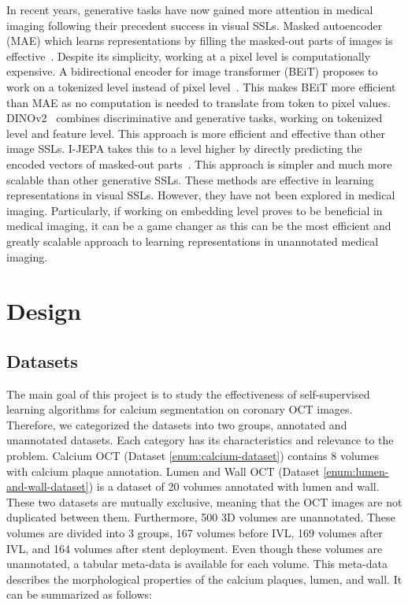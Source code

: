 \documentclass[a4paper,11pt,oneside]{report}
\begin{document}
In recent years, generative tasks have now gained more attention in medical imaging following their precedent success in visual SSLs. Masked autoencoder (MAE) which learns representations by filling the masked-out parts of images is effective~\cite{He2022}. Despite its simplicity, working at a pixel level is computationally expensive. A bidirectional encoder for image transformer (BEiT) proposes to work on a tokenized level instead of pixel level~\cite{Bao2022beit}. This makes BEiT more efficient than MAE as no computation is needed to translate from token to pixel values. DINOv2~\cite{Oquab2024dinov} combines discriminative and generative tasks, working on tokenized level and feature level. This approach is more efficient and effective than other image SSLs. I-JEPA takes this to a level higher by directly predicting the encoded vectors of masked-out parts~\cite{Assran2023}. This approach is simpler and much more scalable than other generative SSLs. These methods are effective in learning representations in visual SSLs. However, they have not been explored in medical imaging. Particularly, if working on embedding level proves to be beneficial in medical imaging, it can be a game changer as this can be the most efficient and greatly scalable approach to learning representations in unannotated medical imaging.


\chapter{Design}



\section{Datasets}\label{sec:design:datasets}
The main goal of this project is to study the effectiveness of self-supervised learning algorithms for calcium segmentation on coronary OCT images. Therefore, we categorized the datasets into two groups, annotated and unannotated datasets. Each category has its characteristics and relevance to the problem. Calcium OCT (Dataset \ref{enum:calcium-dataset}) contains 8 volumes with calcium plaque annotation. Lumen and Wall OCT (Dataset \ref{enum:lumen-and-wall-dataset}) is a dataset of 20 volumes annotated with lumen and wall. These two datasets are mutually exclusive, meaning that the OCT images are not duplicated between them. Furthermore, 500 3D volumes are unannotated. These volumes are divided into 3 groups, 167 volumes before IVL, 169 volumes after IVL, and 164 volumes after stent deployment. Even though these volumes are unannotated, a tabular meta-data is available for each volume. This meta-data describes the morphological properties of the calcium plaques, lumen, and wall. It can be summarized as follows:
\end{document}

